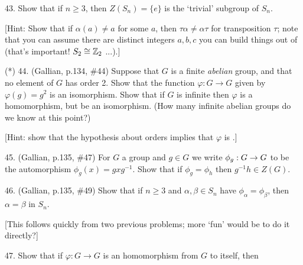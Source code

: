 \documentclass[12pt]{article}
\begin{document}
\begin{description}

\item{43.} Show that if $n\geq 3$, then $Z(S_n)=\{e\}$ is the `trivial' subgroup of $S_n$.

\ssk

\item{\spc} [Hint: Show that if $\alpha(a)\neq a$ for some $a$, then $\tau\alpha\neq\alpha\tau$
for  transposition $\tau$; note that you can assume there are  distinct
integers $a,b,c$ you can build things out of (that's important! $S_2\cong {\mathbb Z}_2$ ...).]

\msk

\item{(*) 44.} (Gallian, p.134, \#44) Suppose that $G$ is a finite {\it abelian} group, and
that no element of $G$ has order 2. Show that the function $\varphi:G\rightarrow G$
given by $\varphi(g)=g^2$ is an isomorphism. Show that if $G$ is infinite then $\varphi$ is a homomorphism,
but   be an isomorphism. (How many infinite abelian groups do we know at this point?)

\msk

\item{\spc} [Hint: show that the hypothesis about orders implies that $\varphi$ is .]

\msk

\item{45.} (Gallian, p.135, \#47) For $G$ a group and $g\in G$ we write $\phi_g:G\rightarrow G$ to be the automorphism
$\phi_g(x)=gxg^{-1}$. Show that if $\phi_g=\phi_h$ then $g^{-1}h\in Z(G)$.

\msk

\item{46.} (Gallian, p.135, \#49) Show that if $n\geq 3$ and $\alpha,\beta\in S_n$ have $\phi_\alpha=\phi_\beta$, then 
$\alpha=\beta$ in $S_n$.

\ssk

\item{\spc} [This follows quickly from two previous problems; more `fun' would be to do it directly?]

\msk

\item{47.} Show that if $\varphi:G\rightarrow G$ is an homomorphism
from $G$ to itself, then 


\msk


\end{description}
\end{document}
